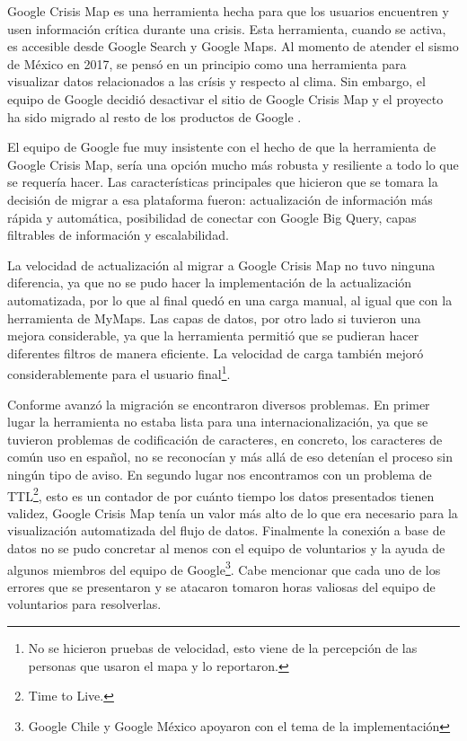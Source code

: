 \documentclass[12pt,spanish,oneside,breaklinks]{book}
\begin{document}
Google Crisis Map es una herramienta hecha para que los usuarios encuentren y usen información crítica durante una crisis. Esta herramienta, cuando se activa, es accesible desde Google Search y Google Maps. Al momento de atender el sismo de México en 2017, se pensó en un principio como una herramienta para visualizar datos relacionados a las crísis y respecto al clima. Sin embargo, el equipo de Google decidió desactivar el sitio de Google Crisis Map y el proyecto ha sido migrado al resto de los productos de Google \cite{googlecrisis}.

El equipo de Google fue muy insistente con el hecho de que la herramienta de Google Crisis Map, sería una opción mucho más robusta y resiliente a todo lo que se requería hacer. Las características principales que hicieron que se tomara la decisión de migrar a esa plataforma fueron: actualización de información más rápida y automática, posibilidad de conectar con Google Big Query, capas filtrables de información y escalabilidad.

La velocidad de actualización al migrar a Google Crisis Map no tuvo ninguna diferencia, ya que no se pudo hacer la implementación de la actualización automatizada, por lo que al final quedó en una carga manual, al igual que con la herramienta de MyMaps. Las capas de datos, por otro lado si tuvieron una mejora considerable, ya que la herramienta permitió que se pudieran hacer diferentes filtros de manera eficiente. La velocidad de carga también mejoró considerablemente para el usuario final\footnote{No se hicieron pruebas de velocidad, esto viene de la percepción de las personas que usaron el mapa y lo reportaron.}.

Conforme avanzó la migración se encontraron diversos problemas. En primer lugar la herramienta no estaba lista para una internacionalización, ya que se tuvieron problemas de codificación de caracteres, en concreto, los caracteres de común uso en español, no se reconocían y más allá de eso detenían el proceso sin ningún tipo de aviso. En segundo lugar nos encontramos con un problema de TTL\footnote{Time to Live.}, esto es un contador de por cuánto tiempo los datos presentados tienen validez,  Google Crisis Map tenía un valor más alto de lo que era necesario para la visualización automatizada del flujo de datos. Finalmente la conexión a base de datos no se pudo concretar al menos con el equipo de voluntarios y la ayuda de algunos miembros del equipo de Google\footnote{Google Chile y Google México apoyaron con el tema de la implementación}. Cabe mencionar que cada uno de los errores que se presentaron y se atacaron tomaron horas valiosas del equipo de voluntarios para resolverlas.
\end{document}
